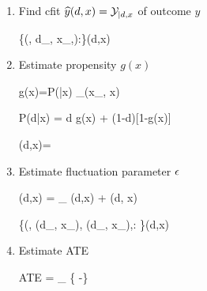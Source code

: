 \begin{enumerate}
\item Find cfit ${\widehat{y}}(d,x)={\cal Y}_{|d,x}$ of outcome $y$

\beq
\{(\s, d_\s, x_\s,):\s\in \Sigma\}\mlarr \haty(d,x)
\eeq

\item Estimate propensity $g(x)$

\beq
g(x)=P(|x)\approx
{}
{\sum_\s \delta(x_\s, x)}
\eeq

\beq
P(d|x) = d g(x) + (1-d)[1-g(x)]
\eeq

\beq
\beta(d,x)=
\eeq

\item Estimate fluctuation parameter $\epsilon$

\beq
\eta(d,x) =
\underbrace{\logit[\haty(d, x)]}_
{\lam(d,x)}
 + \eps \beta(d, x)
\eeq

\beq
\{(\s, \lam(d_\s, x_\s),
\beta(d_\s, x_\s),:
\s\in \Sigma\}\mlarr \HAT{\eta}(d,x)
\eeq

\item Estimate ATE

\beq
ATE =  \sum_\s
\left\{
 \expit[ \HAT{\eta}(d=1,x_\s)]
 -\expit[ \HAT{\eta}(d=0,x_\s)]
 \right\}
\eeq

\end{enumerate}
